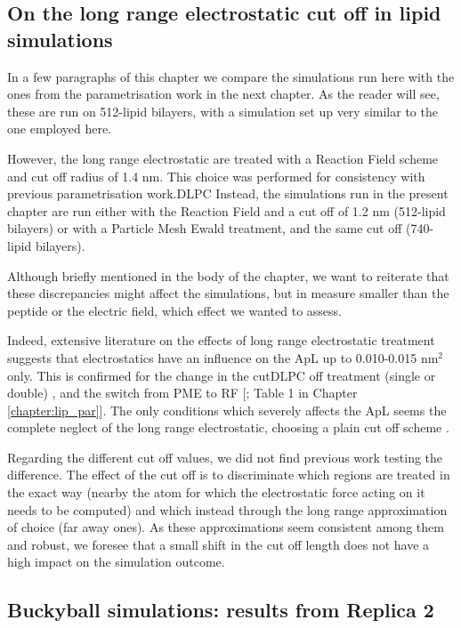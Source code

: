 \subsection{On the long range electrostatic cut off in lipid simulations}
In a few paragraphs of this chapter we compare the simulations run here with the ones from the parametrisation work in the next chapter. As the reader will see, these are run on 512-lipid bilayers, with a simulation set up very similar to the one employed here.

However, the long range electrostatic are treated with a Reaction Field scheme and cut off radius of 1.4 nm. This choice was performed for consistency with previous parametrisation work.DLPC​
%
Instead, the simulations run in the present chapter are run either with the Reaction Field and a cut off of 1.2 nm (512-lipid bilayers) or with a Particle Mesh Ewald treatment, and the same cut off (740-lipid bilayers).

Although briefly mentioned in the body of the chapter, we want to reiterate that these discrepancies might affect the simulations, but in measure smaller than the peptide or the electric field, which effect we wanted to assess.

Indeed, extensive literature on the effects of long range electrostatic treatment suggests that electrostatics have an influence on the ApL up to 0.010-0.015 nm$^2$ only. This is confirmed for the change in the cutDLPC​ off treatment (single or double) \citep{Silva2018,Reisser2017}, and the switch from PME to RF [\citet{Poger2012}; Table 1 in Chapter \ref{chapter:lip_par}].
%
The only conditions which severely affects the ApL seems the complete neglect of the long range electrostatic, choosing a plain cut off scheme \citep{Patra2003}.

Regarding the different cut off values, we did not find previous work testing the difference. The effect of the cut off is to discriminate which regions are treated in the exact way (nearby the atom for which the electrostatic force acting on it needs to be computed) and which instead through the long range approximation of choice (far away ones). As these approximations seem consistent among them and robust, we foresee that a small shift in the cut off length does not have a high impact on the simulation outcome.


\subsection{Buckyball simulations: results from Replica 2}

